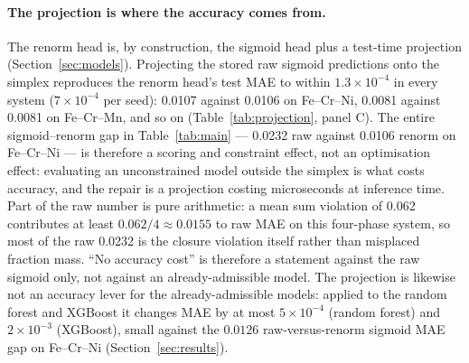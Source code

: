 \documentclass[preprint,12pt,authoryear]{elsarticle}
\begin{document}
\paragraph{The projection is where the accuracy comes from.}
The renorm head is, by construction, the sigmoid head plus a test-time
projection (Section~\ref{sec:models}). Projecting the stored raw sigmoid
predictions onto the simplex reproduces the renorm head's test MAE to
within $1.3\times10^{-4}$ in every system ($7\times10^{-4}$ per seed):
0.0107 against 0.0106 on Fe--Cr--Ni, 0.0081 against 0.0081 on
Fe--Cr--Mn, and so on (Table~\ref{tab:projection}, panel C). The entire
sigmoid--renorm gap in Table~\ref{tab:main} --- 0.0232 raw against 0.0106
renorm on Fe--Cr--Ni --- is therefore a scoring and constraint effect,
not an optimisation effect: evaluating an unconstrained model outside the
simplex is what costs accuracy, and the repair is a projection costing
microseconds at inference time. Part of the raw number is pure arithmetic:
a mean sum violation of 0.062 contributes at least $0.062/4 \approx 0.0155$
to raw MAE on this four-phase system, so most of the raw 0.0232 is the
closure violation itself rather than misplaced fraction mass. ``No accuracy
cost'' is therefore a statement against the raw sigmoid only, not against
an already-admissible model. The projection is likewise not an
accuracy lever for the already-admissible models: applied to the random
forest and XGBoost it changes MAE by at most $5\times10^{-4}$ (random
forest) and $2\times10^{-3}$ (XGBoost), small against the $0.0126$
raw-versus-renorm sigmoid MAE gap on Fe--Cr--Ni
(Section~\ref{sec:results}).
\end{document}
